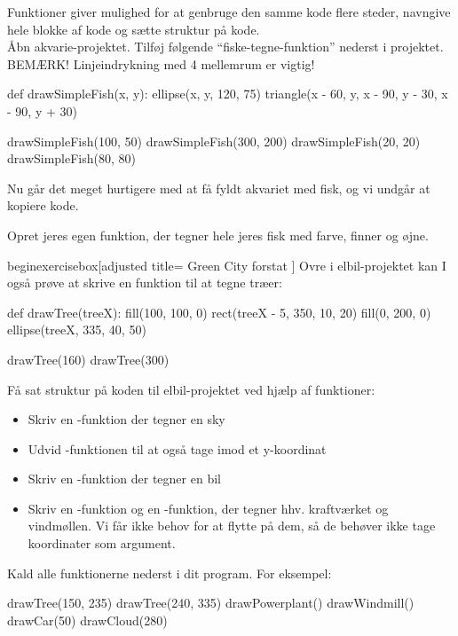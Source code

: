 \documentclass{ucph-handout}
\newcounter{handout}
\begin{document}
\newpage
{}

\begin{exercisebox}[adjusted title = Funktioner]
Funktioner giver mulighed for at genbruge den samme kode flere steder,
navngive hele blokke af kode og sætte struktur på kode.\\

\noindent
Åbn akvarie-projektet. Tilføj følgende ``fiske-tegne-funktion''
nederst i projektet. BEMÆRK! Linjeindrykning med 4 mellemrum er vigtig!

\begin{python}
def drawSimpleFish(x, y):
    ellipse(x, y, 120, 75)
    triangle(x - 60, y, x - 90, y - 30, x - 90, y + 30)

drawSimpleFish(100,  50)
drawSimpleFish(300, 200)
drawSimpleFish(20, 20)
drawSimpleFish(80, 80)
\end{python}
Nu går det meget hurtigere med at få fyldt akvariet med fisk, og vi
undgår at kopiere kode.

 Opret jeres egen  funktion, der tegner hele jeres
fisk med farve, finner og øjne.

begin{exercisebox}[adjusted title= Green City forstat ]
Ovre i elbil-projektet kan I også prøve at skrive en funktion
til at tegne træer:
\begin{python}
def drawTree(treeX):
    fill(100, 100, 0)
    rect(treeX - 5, 350, 10, 20)
    fill(0, 200, 0)
    ellipse(treeX, 335, 40, 50)

drawTree(160)
drawTree(300)
\end{python}

\noindent
Få sat struktur på koden til elbil-projektet ved hjælp af funktioner:
\begin{itemize}
\item Skriv en -funktion der tegner en sky
\item Udvid -funktionen til at også tage imod et y-koordinat
\item Skriv en -funktion der tegner en bil
\item Skriv en -funktion og en
  -funktion, der tegner hhv. kraftværket og
  vindmøllen. Vi får ikke behov for at flytte på dem, så de behøver
  ikke tage koordinater som argument.
\end{itemize}

\noindent
Kald alle funktionerne nederst i dit program. For eksempel:

\begin{python}
drawTree(150, 235)
drawTree(240, 335)
drawPowerplant()
drawWindmill()
drawCar(50)
drawCloud(280)
\end{python}
\end{exercisebox}
\end{document}

